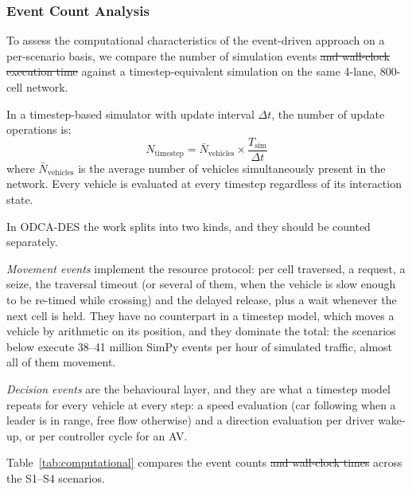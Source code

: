 \documentclass[review,authoryear]{elsarticle}
\providecommand{\DIFdeltex}[1]{{\protect\color{red}\sout{#1}}}                      %
\providecommand{\DIFdelbegin}{} %
\providecommand{\DIFdelend}{} %
\providecommand{\DIFdel}[1]{\texorpdfstring{\DIFdeltex{#1}}{}} %
\newcommand{\DIFscaledelfig}{0.5}
\newlength{\DIFdelgraphicswidth} %
\newlength{\DIFdelgraphicsheight} %
\newcommand{\DIFdelincludegraphics}[2][]{%
\sbox{\DIFdelgraphicsbox}{\DIFOincludegraphics[#1]{#2}}%
\settoboxwidth{\DIFdelgraphicswidth}{\DIFdelgraphicsbox} %
\settoboxtotalheight{\DIFdelgraphicsheight}{\DIFdelgraphicsbox} %
\scalebox{\DIFscaledelfig}{%
\parbox[b]{\DIFdelgraphicswidth}{\usebox{\DIFdelgraphicsbox}\\[-\baselineskip] \rule{\DIFdelgraphicswidth}{0em}}\llap{\resizebox{\DIFdelgraphicswidth}{\DIFdelgraphicsheight}{%
\setlength{\unitlength}{\DIFdelgraphicswidth}%
\begin{picture}(1,1)%
\thicklines\linethickness{2pt} %
{\color[rgb]{1,0,0}\put(0,0){\framebox(1,1){}}}%
{\color[rgb]{1,0,0}\put(0,0){\line( 1,1){1}}}%
{\color[rgb]{1,0,0}\put(0,1){\line(1,-1){1}}}%
\end{picture}%
}\hspace*{3pt}}} %
} %
\DeclareRobustCommand{\DIFdelbegin}{\DIFOdelbegin \let\includegraphics\DIFdelincludegraphics} %
\DeclareRobustCommand{\DIFdelend}{\DIFOaddend \let\includegraphics\DIFOincludegraphics} %
\begin{document}
\subsubsection{Event Count Analysis}
\label{sec:exp_event_count}

To assess the computational characteristics of the event-driven approach on a per-scenario basis, we compare the number of simulation events \DIFdelbegin \DIFdel{and wall-clock execution time }\DIFdelend against a timestep-equivalent simulation on the same 4-lane, 800-cell network.

In a timestep-based simulator with update interval $\Delta t$, the number of update operations is:
\begin{equation}
    N_{\text{timestep}} = \bar{N}_{\text{vehicles}} \times \frac{T_{\text{sim}}}{\Delta t}
    \label{eq:timestep_count}
\end{equation}
where $\bar{N}_{\text{vehicles}}$ is the average number of vehicles simultaneously present in the network. Every vehicle is evaluated at every timestep regardless of its interaction state.

In ODCA-DES the work splits into two kinds, and they should be counted separately.

\emph{Movement events} implement the resource protocol: per cell traversed, a request, a seize, the traversal timeout (or several of them, when the vehicle is slow enough to be re-timed while crossing) and the delayed release, plus a wait whenever the next cell is held. They have no counterpart in a timestep model, which moves a vehicle by arithmetic on its position, and they dominate the total: the scenarios below execute 38--41 million SimPy events per hour of simulated traffic, almost all of them movement.

\emph{Decision events} are the behavioural layer, and they are what a timestep model repeats for every vehicle at every step: a speed evaluation (car following when a leader is in range, free flow otherwise) and a direction evaluation per driver wake-up, or per controller cycle for an AV.

Table~\ref{tab:computational} compares the event counts \DIFdelbegin \DIFdel{and wall-clock times }\DIFdelend across the S1--S4 scenarios.
\end{document}
